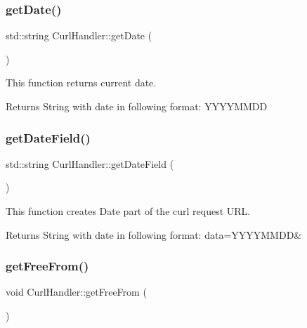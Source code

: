 \subsubsection{\texorpdfstring{get\+Date()}{getDate()}}
{\footnotesize\ttfamily std\+::string Curl\+Handler\+::get\+Date (\begin{DoxyParamCaption}{ }\end{DoxyParamCaption})}



This function returns current date. 

\begin{DoxyReturn}{Returns}
String with date in following format\+: Y\+Y\+Y\+Y\+M\+M\+DD 
\end{DoxyReturn}
\mbox{\label{classCurlHandler_a021967e447f8980a4629b85cc3683a93}} 
\subsubsection{\texorpdfstring{get\+Date\+Field()}{getDateField()}}
{\footnotesize\ttfamily std\+::string Curl\+Handler\+::get\+Date\+Field (\begin{DoxyParamCaption}{ }\end{DoxyParamCaption})}



This function creates Date part of the curl request U\+RL. 

\begin{DoxyReturn}{Returns}
String with date in following format\+: data=Y\+Y\+Y\+Y\+M\+M\+DD\& 
\end{DoxyReturn}
\mbox{\label{classCurlHandler_a43b8d7b4ec2866c34820baa71236a15a}} 
\subsubsection{\texorpdfstring{get\+Free\+From()}{getFreeFrom()}}
{\footnotesize\ttfamily void Curl\+Handler\+::get\+Free\+From (\begin{DoxyParamCaption}{ }\end{DoxyParamCaption})}



